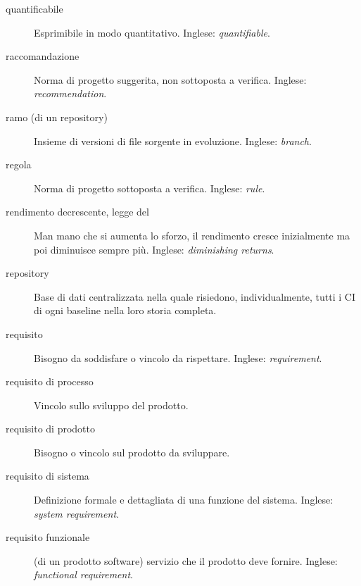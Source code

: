 \documentclass[a4paper]{article}
\begin{document}
\begin{description}
	\item[quantificabile] 

			Esprimibile in modo quantitativo. Inglese: \emph{quantifiable}.
			
	\item[raccomandazione] 

			Norma di progetto suggerita, non sottoposta a verifica. Inglese: \emph{recommendation}.
			
	\item[ramo (di un repository)] 

			Insieme di versioni di file sorgente in evoluzione. Inglese: \emph{branch}.
			
	\item[regola] 

			Norma di progetto sottoposta a verifica. Inglese: \emph{rule}.
			
	\item[rendimento decrescente, legge del] 

			Man mano che si aumenta lo sforzo, il rendimento cresce inizialmente ma poi diminuisce sempre più. Inglese: \emph{diminishing returns}.
			
	\item[repository] 

			Base di dati centralizzata nella quale risiedono, individualmente, tutti i CI di ogni baseline nella loro storia completa.
			
	\item[requisito] 

			Bisogno da soddisfare o vincolo da rispettare. Inglese: \emph{requirement}.
			
	\item[requisito di processo] 

			Vincolo sullo sviluppo del prodotto.
			
	\item[requisito di prodotto] 

			Bisogno o vincolo sul prodotto da sviluppare.
			
	\item[requisito di sistema] 

			Definizione formale e dettagliata di una funzione del sistema. Inglese: \emph{system requirement}.
			
	\item[requisito funzionale] 

			(di un prodotto software) servizio che il prodotto deve fornire. Inglese: \emph{functional requirement}.
			

\end{description}
\end{document}
